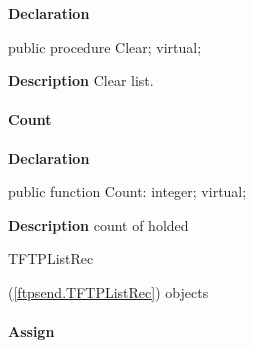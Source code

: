 \documentclass{report}
\newif\ifpdf
\begin{document}
\label{ftpsend.TFTPList-Clear}
\begin{list}{}{
\setlength{\itemindent}{0cm}
\setlength{\listparindent}{0cm}
\setlength{\leftmargin}{\evensidemargin}
\addtolength{\leftmargin}{\tmplength}
\settowidth{\labelsep}{X}
\addtolength{\leftmargin}{\labelsep}
\setlength{\labelwidth}{\tmplength}
}
\item[\textbf{Declaration}\hfill]
\ifpdf
\begin{flushleft}
\fi
\begin{ttfamily}
public procedure Clear; virtual;\end{ttfamily}

\ifpdf
\end{flushleft}
\fi

\par
\item[\textbf{Description}]
Clear list.

\end{list}
\paragraph*{Count}\hspace*{\fill}

\label{ftpsend.TFTPList-Count}
\begin{list}{}{
\setlength{\itemindent}{0cm}
\setlength{\listparindent}{0cm}
\setlength{\leftmargin}{\evensidemargin}
\addtolength{\leftmargin}{\tmplength}
\settowidth{\labelsep}{X}
\addtolength{\leftmargin}{\labelsep}
\setlength{\labelwidth}{\tmplength}
}
\item[\textbf{Declaration}\hfill]
\ifpdf
\begin{flushleft}
\fi
\begin{ttfamily}
public function Count: integer; virtual;\end{ttfamily}

\ifpdf
\end{flushleft}
\fi

\par
\item[\textbf{Description}]
count of holded \begin{ttfamily}TFTPListRec\end{ttfamily}(\ref{ftpsend.TFTPListRec}) objects

\end{list}
\paragraph*{Assign}\hspace*{\fill}
\end{document}
